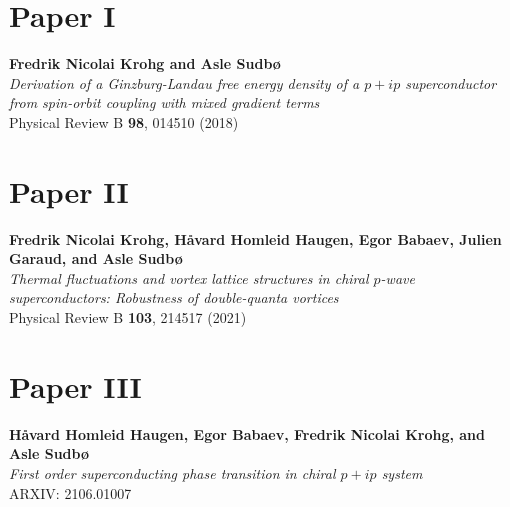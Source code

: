 \clearpage
\pagestyle{empty}
\renewcommand*{\chapterpagestyle}{empty}

\makeatletter
\renewcommand{\chapterlineswithprefixformat}[3]{
\centering\@hangfrom{#2}{#3\par\vspace{-3pt}}
\centerline{\rule{0.67\textwidth}{0.5\ruleWidth}}
}
\makeatother

\chapter*{Paper I}
\label{pap:I}
\begin{center}
{\bfseries Fredrik Nicolai Krohg and Asle Sudb\o{}}\\
\bigskip
\textit{Derivation of a Ginzburg-Landau free energy density of a $p+ip$ superconductor from spin-orbit coupling with mixed gradient terms}\\
\bigskip
Physical Review B {\bfseries 98}, 014510 (2018)
\end{center}
\cleardoublepage



\chapter*{Paper II}
\label{pap:II}
\begin{center}
    {\bfseries Fredrik Nicolai Krohg, H\r{a}vard Homleid Haugen, Egor Babaev, Julien Garaud, and Asle Sudb\o{}}\\
\bigskip
\textit{Thermal fluctuations and vortex lattice structures in chiral $p$-wave superconductors: Robustness of double-quanta vortices}\\
\bigskip
Physical Review B {\bfseries 103}, 214517 (2021)
\end{center}
\cleardoublepage



\chapter*{Paper III}
\label{pap:III}
\begin{center}
    {\bfseries H\r{a}vard Homleid Haugen, Egor Babaev, Fredrik Nicolai Krohg, and Asle Sudb\o{}}\\
\bigskip
\textit{First order superconducting phase transition in chiral $p+ip$ system}\\
\bigskip
ARXIV: 2106.01007
\end{center}
\cleardoublepage

